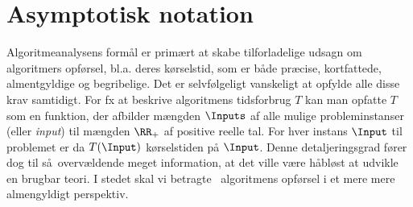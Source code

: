 \section{Asymptotisk notation}

Algoritmeanalysens formål er primært at skabe tilforladelige udsagn om algoritmers opførsel, bl.a. deres kørselstid, som er både præcise, kortfattede, almentgyldige og begribelige.
Det er selvfølgeligt vanskeligt at opfylde alle disse krav samtidigt.
For fx at beskrive algoritmens tidsforbrug $T$
kan man opfatte $T$ som en funktion, der afbilder mængden
 $\Inputs$
 af alle mulige probleminstanser (eller \emph{input})
til mængden $\RR_+$ af positive reelle tal.
For hver instans 
$\Input$ til problemet er da $T(\Input)$ kørselstiden på $\Input$. 
Denne detaljeringsgrad fører dog til så overvældende meget information, at det ville være håbløst at udvikle en brugbar teori.
I stedet skal vi betragte  algoritmens opførsel i et mere mere almengyldigt perspektiv.

